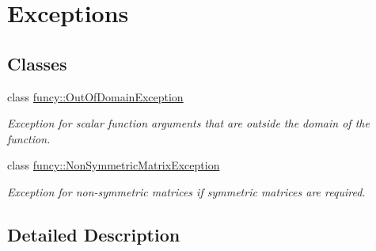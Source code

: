 \hypertarget{group__Exceptions}{\section{Exceptions}
\label{group__Exceptions}
}
\subsection*{Classes}
\begin{DoxyCompactItemize}
\item 
class \hyperlink{classfuncy_1_1OutOfDomainException}{funcy\-::\-Out\-Of\-Domain\-Exception}
\begin{DoxyCompactList}\small\item\em Exception for scalar function arguments that are outside the domain of the function. \end{DoxyCompactList}\item 
class \hyperlink{classfuncy_1_1NonSymmetricMatrixException}{funcy\-::\-Non\-Symmetric\-Matrix\-Exception}
\begin{DoxyCompactList}\small\item\em Exception for non-\/symmetric matrices if symmetric matrices are required. \end{DoxyCompactList}\end{DoxyCompactItemize}


\subsection{Detailed Description}
